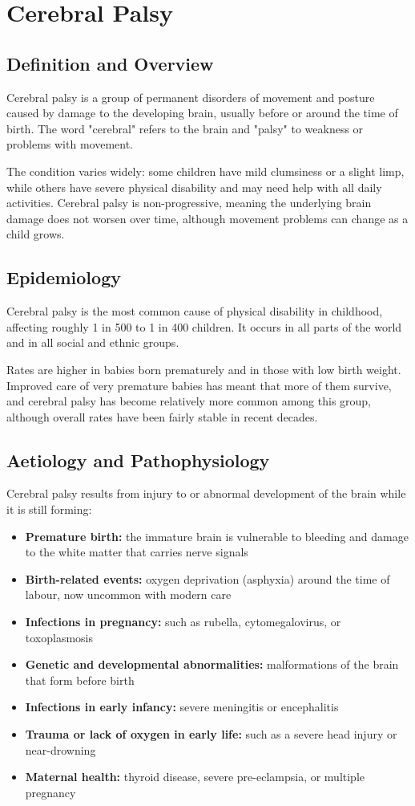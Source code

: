 \chapter{Cerebral Palsy}

\section*{Definition and Overview}
Cerebral palsy is a group of permanent disorders of movement and posture caused by damage to the developing brain, usually before or around the time of birth. The word "cerebral" refers to the brain and "palsy" to weakness or problems with movement.

The condition varies widely: some children have mild clumsiness or a slight limp, while others have severe physical disability and may need help with all daily activities. Cerebral palsy is non-progressive, meaning the underlying brain damage does not worsen over time, although movement problems can change as a child grows.

\section*{Epidemiology}
Cerebral palsy is the most common cause of physical disability in childhood, affecting roughly 1 in 500 to 1 in 400 children. It occurs in all parts of the world and in all social and ethnic groups.

Rates are higher in babies born prematurely and in those with low birth weight. Improved care of very premature babies has meant that more of them survive, and cerebral palsy has become relatively more common among this group, although overall rates have been fairly stable in recent decades.

\section*{Aetiology and Pathophysiology}
Cerebral palsy results from injury to or abnormal development of the brain while it is still forming:

\begin{itemize}
    \item \textbf{Premature birth:} the immature brain is vulnerable to bleeding and damage to the white matter that carries nerve signals
    \item \textbf{Birth-related events:} oxygen deprivation (asphyxia) around the time of labour, now uncommon with modern care
    \item \textbf{Infections in pregnancy:} such as rubella, cytomegalovirus, or toxoplasmosis
    \item \textbf{Genetic and developmental abnormalities:} malformations of the brain that form before birth
    \item \textbf{Infections in early infancy:} severe meningitis or encephalitis
    \item \textbf{Trauma or lack of oxygen in early life:} such as a severe head injury or near-drowning
    \item \textbf{Maternal health:} thyroid disease, severe pre-eclampsia, or multiple pregnancy
\end{itemize}

